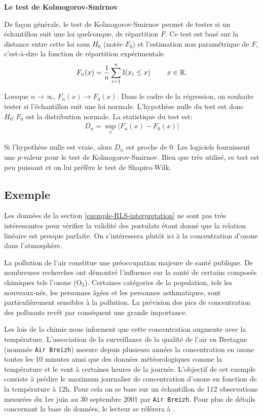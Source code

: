 \textbf{Le test de Kolmogorov-Smirnov}

De façon générale, le test de Kolmogorov-Smirnov permet de tester si un échantillon suit une loi quelconque, de répartition $F$. Ce test est basé sur la distance entre cette loi  sous $H_0$ (notée $F_0$) et l'estimation non paramétrique de $F$, c'est-à-dire la fonction de répartition expérimentale
 \[ F_n (x)=\frac{1}{n} \sum_{i=1}^n \mathbb{I} (x_i \leq x) \ \ \ \ \ \ \ x\in \mathbb{R}.
\]

Lorsque $n \rightarrow \infty$, $ F_n (x) \rightarrow F_0 (x)$. Dans le cadre de la régression, on souhaite tester si l'échantillon suit une loi normale. L'hypothèse nulle du test est donc $H_0: F_0$ est la distribution normale. La statistique du test est:
\begin{eqnarray*}
 D_n = \sup_{x} \left|F_n (x) - F_0 (x) \right|
\end{eqnarray*}

Si l'hypothèse nulle est vraie, alors $D_n$ est proche de 0. Les logiciels fournissent une $p$-valeur pour le test de Kolmogorov-Smirnov. Bien que très utilisé, ce test est peu puissant et on lui préfère le test de Shapiro-Wilk.


\subsection{Exemple}

Les données de la section \ref{exemple-RLS-interpretation} ne sont pas très intéressantes pour vérifier la validité des postulats étant donné que la relation linéaire est presque parfaite. On s'intéressera plutôt ici à la concentration d'ozone dans l'atmosphère.

La pollution de l'air constitue une préoccupation majeure de santé publique. De nombreuses recherches ont démontré l'influence sur la santé de certains composés chimiques tels l'ozone (O$_3$). Certaines catégories de la population, tels les nouveaux-nés, les personnes âgées et les personnes asthmatiques, sont particulièrement sensibles à la pollution. La prévision des pics de concentration des polluants revêt par conséquent une grande importance.

Les lois de la chimie nous informent que cette concentration augmente avec la température. L'association de la surveillance de la qualité de l'air en Bretagne (nommée \texttt{Air Breizh}) mesure depuis plusieurs années la concentration en ozone toutes les 10 minutes ainsi que des données météorologiques comme la température et le vent à certaines heures de la journée.  L'objectif de cet exemple consiste à prédire le maximum journalier de concentration d'ozone en fonction de la température à 12h. Pour cela on se base sur un échantillon de 112 observations mesurées du 1er juin au 30 septembre 2001 par \texttt{Air Breizh}. Pour plus de détails concernant la base de données, le lecteur se référera à  \citet[][Section 1.1.1]{Cor_Mat:07}.

